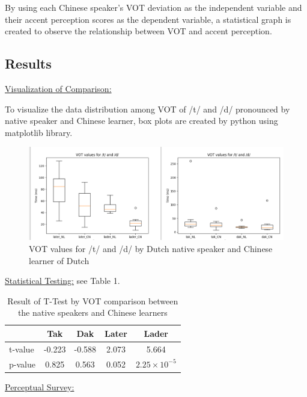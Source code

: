 \documentclass[runningheads]{llncs}
\begin{document}
By using each Chinese speaker's VOT deviation as the independent variable and their accent perception scores as the dependent variable, a statistical graph is created to observe the relationship between VOT and accent perception.

\subsection*{Results}

\underline{Visualization of Comparison:}

To visualize the data distribution among VOT of /t/ and /d/ pronounced by native speaker and Chinese learner, box plots are created by python using matplotlib library. 
\begin{figure}
    \centering
    \includegraphics[width=1\textwidth]{Figure1.jpg}
    \caption{VOT values for /t/ and /d/ by Dutch native speaker and Chinese learner of Dutch}
\end{figure}

\underline{Statistical Testing:} see Table 1.
\begin{table}
	\centering
	\caption{Result of T-Test by VOT comparison between the native speakers and Chinese learners}
	\begin{tabular}{lcccc}
	\toprule
	& Tak & Dak & Later & Lader \\
	\midrule
	t-value & -0.223 & -0.588 & 2.073 & 5.664 \\
	p-value & 0.825 & 0.563 & 0.052 & $2.25 \times 10^{-5}$ \\
	\bottomrule
	\end{tabular}
\end{table}


\underline{Perceptual Survey:}
\end{document}
